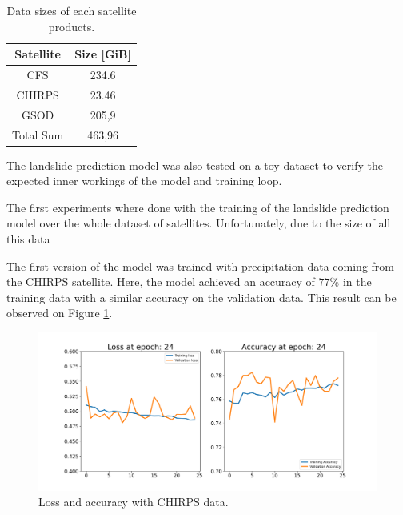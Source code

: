 \documentclass[sigconf, nonacm]{acmart}
\begin{document}





\begin{table}
\caption{Data sizes of each satellite products.}%
\begin{tabular}{|c|c|}
\hline
\textbf{Satellite} & \textbf{Size {[}GiB{]}} \\ \hline
CFS                & 234.6                   \\ \hline
CHIRPS             & 23.46                   \\ \hline
GSOD               & 205,9                   \\ \hline
Total Sum          & 463,96                  \\ \hline
\end{tabular}
\end{table}

The landslide prediction model was also tested on a toy dataset to verify the expected inner workings of the model and training loop.

The first experiments where done with the training of the landslide prediction model over the whole dataset of satellites. Unfortunately, due to the size of all this data 

The first version of the model was trained with precipitation data coming from the CHIRPS satellite. Here, the model achieved an accuracy of $77\%$ in the training data with a similar accuracy on the validation data. This result can be observed on Figure \ref{fig:resultado01}. 


 \begin{figure}
  \centering
  \includegraphics[width=1.1\linewidth]{figures/the_final.png}
  \caption{Loss and accuracy with CHIRPS data.}
  \label{fig:resultado01}
\end{figure}
\end{document}
